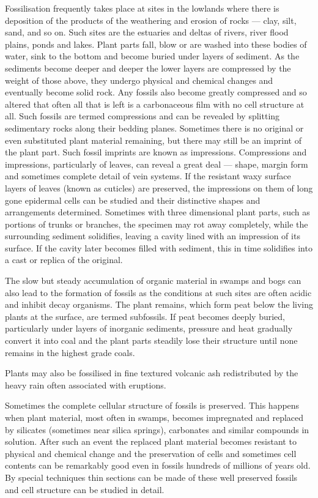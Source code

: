 Fossilisation frequently takes place at sites in the lowlands where there is deposition of the products of the weathering and erosion of rocks — clay, silt, sand, and so on.
Such sites are the estuaries and deltas of rivers, river flood plains, ponds and lakes.
Plant parts fall, blow or are washed into these bodies of water, sink to the bottom and become buried under layers of sediment.
As the sediments become deeper and deeper the lower layers are compressed by the weight of those above, they undergo physical and chemical changes and eventually become solid rock.
Any fossils also become greatly compressed and so altered that often all that is left is a carbonaceous film with no cell structure at all.
Such fossils are termed compressions and can be revealed by splitting sedimentary rocks along their bedding planes.
Sometimes there is no original or even substituted plant material remaining, but there may still be an imprint of the plant part.
Such fossil imprints are known as impressions.
Compressions and impressions, particularly of leaves, can reveal a great deal — shape, margin form and sometimes complete detail of vein systems.
If the resistant waxy surface layers of leaves (known as cuticles) are preserved, the impressions on them of long gone epidermal cells can be studied and their distinctive shapes and arrangements determined.
Sometimes with three dimensional plant parts, such as portions of trunks or branches, the specimen may rot away completely, while the surrounding sediment solidifies, leaving a cavity lined with an impression of its surface.
If the cavity later becomes filled with sediment, this in time solidifies into a cast or replica of the original.

The slow but steady accumulation of organic material in swamps and bogs can also lead to the formation of fossils as the conditions at such sites are often acidic and inhibit decay organisms.
The plant remains, which form peat below the living plants at the surface, are termed subfossils.
If peat becomes deeply buried, particularly under layers of inorganic sediments, pressure and heat gradually convert it into coal and the plant parts steadily lose their structure until none remains in the highest grade coals.

Plants may also be fossilised in fine textured volcanic ash redistributed by the heavy rain often associated with eruptions.

Sometimes the complete cellular structure of fossils is preserved.
This happens when plant material, most often in swamps, becomes impregnated and replaced by silicates (sometimes near silica springs), carbonates and similar compounds in solution.
After such an event the replaced plant material becomes resistant to physical and chemical change and the preservation of cells and sometimes cell contents can be remarkably good even in fossils hundreds of millions of years old.
By special techniques thin sections can be made of these well preserved fossils and cell structure can be studied in detail.

